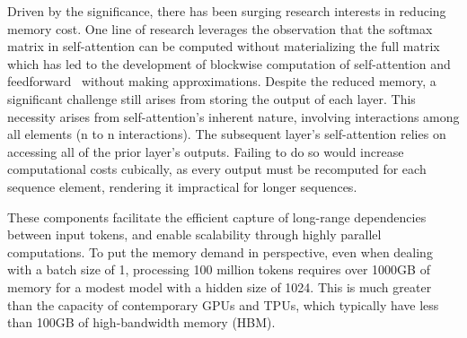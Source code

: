 Driven by the significance, there has been surging research interests in reducing memory cost. One line of research leverages the observation that the softmax matrix in self-attention can be computed without materializing the full matrix~\citep{milakov2018online} which has led to the development of blockwise computation of self-attention and feedforward~\citep{rabe2021self, dao2022flashattention, liu2023blockwise} without making approximations. Despite the reduced memory, a significant challenge still arises from storing the output of each layer. This necessity arises from self-attention's inherent nature, involving interactions among all elements (n to n interactions). The subsequent layer's self-attention relies on accessing all of the prior layer's outputs. Failing to do so would increase computational costs cubically, as every output must be recomputed for each sequence element, rendering it impractical for longer sequences.

These components facilitate the efficient capture of long-range dependencies between input tokens, and enable scalability through highly parallel computations. To put the memory demand in perspective, even when dealing with a batch size of 1, processing 100 million tokens requires over 1000GB of memory for a modest model with a hidden size of 1024. This is much greater than the capacity of contemporary GPUs and TPUs, which typically have less than 100GB of high-bandwidth memory (HBM).

